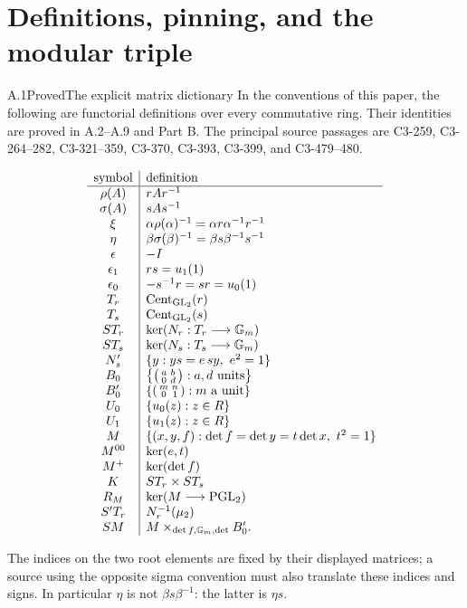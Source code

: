 \section{Definitions, pinning, and the modular triple}

\begin{statement}{A.1}{Proved}{The explicit matrix dictionary}
In the conventions of this paper, the following are functorial
definitions over every commutative ring. Their identities are
proved in A.2--A.9 and Part B. The principal source passages
are C3-259, C3-264--282, C3-321--359, C3-370, C3-393,
C3-399, and C3-479--480.

$$
\begin{array}{c|l}
\text{symbol}&\text{definition}\\ \hline
\rho(A)&rAr^{-1}\\
\sigma(A)&sAs^{-1}\\
\xi&\alpha\rho(\alpha)^{-1}
       =\alpha r\alpha^{-1}r^{-1}\\
\eta&\beta\sigma(\beta)^{-1}
       =\beta s\beta^{-1}s^{-1}\\
\epsilon&-I\\
\epsilon_1&rs=u_1(1)\\
\epsilon_0&-s^{-1}r=sr=u_0(1)\\
T_r&\operatorname{Cent}_{\operatorname{GL}_2}(r)\\
T_s&\operatorname{Cent}_{\operatorname{GL}_2}(s)\\
ST_r&\ker(N_r:T_r\longrightarrow\mathbb G_m)\\
ST_s&\ker(N_s:T_s\longrightarrow\mathbb G_m)\\
N'_s&\{y:ys=e\,sy,\ e^2=1\}\\
B_0&\left\{\left(\begin{smallmatrix}a&b\\0&d\end{smallmatrix}\right):
                  a,d\text{ units}\right\}\\
B'_0&\left\{\left(\begin{smallmatrix}m&n\\0&1\end{smallmatrix}\right):
                  m\text{ a unit}\right\}\\
U_0&\{u_0(z):z\in R\}\\
U_1&\{u_1(z):z\in R\}\\
M&\{(x,y,f):\det f=\det y=t\det x,\ t^2=1\}\\
M^{00}&\ker(e,t)\\
M^+&\ker(\det f)\\
K&ST_r\times ST_s\\
R_M&\ker(M\longrightarrow\operatorname{PGL}_2)\\
S'T_r&N_r^{-1}(\mu_2)\\
SM&M\times_{\det f,\mathbb G_m,\det}B'_0 .
\end{array}
$$

The indices on the two root elements are fixed by their displayed
matrices; a source using the opposite sigma convention must also
translate these indices and signs. In particular $\eta$ is not
$\beta s\beta^{-1}$: the latter is $\eta s$.
\end{statement}
